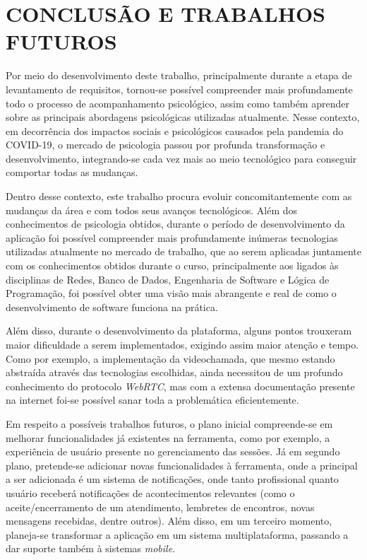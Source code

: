 \chapter{CONCLUSÃO E TRABALHOS FUTUROS}
\label{chap:conclusao}

Por meio do desenvolvimento deste trabalho, principalmente durante a etapa de levantamento de requisitos, tornou-se possível compreender mais profundamente todo o processo de acompanhamento psicológico, assim como também aprender sobre as principais abordagens psicológicas utilizadas atualmente. Nesse contexto, em decorrência dos impactos sociais e psicológicos causados pela pandemia do COVID-19, o mercado de psicologia passou por profunda transformação e desenvolvimento, integrando-se cada vez mais ao meio tecnológico para conseguir comportar todas as mudanças.

Dentro desse contexto, este trabalho procura evoluir concomitantemente com as mudanças da área e com todos seus avanços tecnológicos. Além dos conhecimentos de psicologia obtidos, durante o período de desenvolvimento da aplicação foi possível compreender mais profundamente inúmeras tecnologias utilizadas atualmente no mercado de trabalho, que ao serem aplicadas juntamente com os conhecimentos obtidos durante o curso, principalmente aos ligados às disciplinas de Redes, Banco de Dados, Engenharia de Software e Lógica de Programação, foi possível obter uma visão mais abrangente e real de como o desenvolvimento de software funciona na prática.

Além disso, durante o desenvolvimento da plataforma, alguns pontos trouxeram maior dificuldade a serem implementados, exigindo assim maior atenção e tempo. Como por exemplo, a implementação da videochamada, que mesmo estando abstraída através das tecnologias escolhidas, ainda necessitou de um profundo conhecimento do protocolo \textit{WebRTC},  mas com a extensa documentação presente na internet foi-se possível sanar toda a problemática eficientemente.

Em respeito a possíveis trabalhos futuros, o plano inicial compreende-se em melhorar funcionalidades já existentes na ferramenta, como por exemplo, a experiência de usuário presente no gerenciamento das sessões. Já em segundo plano, pretende-se adicionar novas funcionalidades à ferramenta, onde a principal a ser adicionada é um sistema de notificações, onde tanto profissional quanto usuário receberá notificações de acontecimentos relevantes (como o aceite/encerramento de um atendimento, lembretes de encontros, novas mensagens recebidas, dentre outros). Além disso, em um terceiro momento, planeja-se transformar a aplicação em um sistema multiplataforma, passando a dar suporte também à sistemas \textit{mobile}.
